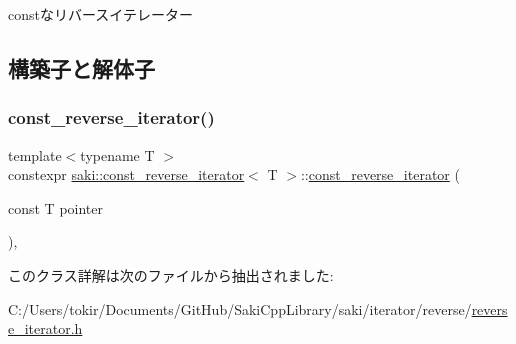 constなリバースイテレーター 

\subsection{構築子と解体子}
\mbox{\label{classsaki_1_1const__reverse__iterator_ae696e711d884b66fb36c20262446cfae}} 
\subsubsection{\texorpdfstring{const\+\_\+reverse\+\_\+iterator()}{const\_reverse\_iterator()}}
{\footnotesize\ttfamily template$<$typename T $>$ \\
constexpr \mbox{\hyperlink{classsaki_1_1const__reverse__iterator}{saki\+::const\+\_\+reverse\+\_\+iterator}}$<$ T $>$\+::\mbox{\hyperlink{classsaki_1_1const__reverse__iterator}{const\+\_\+reverse\+\_\+iterator}} (\begin{DoxyParamCaption}\item[{const T}]{pointer }\end{DoxyParamCaption})\hspace{0.3cm}{\ttfamily [inline]}, {\ttfamily [explicit]}}



このクラス詳解は次のファイルから抽出されました\+:\begin{DoxyCompactItemize}
\item 
C\+:/\+Users/tokir/\+Documents/\+Git\+Hub/\+Saki\+Cpp\+Library/saki/iterator/reverse/\mbox{\hyperlink{reverse__iterator_8h}{reverse\+\_\+iterator.\+h}}\end{DoxyCompactItemize}
